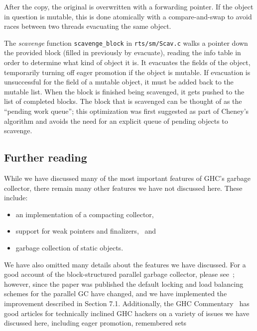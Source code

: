After the copy, the original is overwritten with a forwarding pointer.
If the object in question is mutable, this is done atomically with a
compare-and-swap to avoid races between two threads evacuating the same
object.

The \emph{scavenge} function \verb|scavenge_block| in
\verb|rts/sm/Scav.c| walks a pointer down the provided block (filled in
previously by evacuate), reading the info table in order to determine
what kind of object it is.  It evacuates the fields of the object,
temporarily turning off eager promotion if the object is mutable.  If
evacuation is unsuccessful for the field of a mutable object, it must be
added back to the mutable list.  When the block is finished being
scavenged, it gets pushed to the list of completed blocks.  The block
that is scavenged can be thought of as the ``pending work queue''; this
optimization was first suggested as part of Cheney's algorithm and
avoids the need for an explicit queue of pending objects to scavenge.

\subsection{Further reading}

While we have discussed many of the most important features of GHC's
garbage collector, there remain many other features we have not
discussed here.  These include:

\begin{itemize}
    \item an implementation of a compacting collector, 
    \item support for weak pointers and finalizers,~\cite{PeytonJones:1999:SSM:647978.743369}  and
    \item garbage collection of static objects.
\end{itemize}

We have also omitted many details about the features we have discussed.
For a good account of the block-structured parallel garbage collector,
please see~\cite{Marlow:2008:PGG:1375634.1375637}; however, since the
paper was published the default locking and load balancing schemes for
the parallel GC have changed, and we have implemented the improvement
described in Section 7.1.  Additionally, the GHC Commentary~\cite{ghc-gc-commentary} has good
articles for technically inclined GHC hackers on a variety of issues we
have discussed here, including eager promotion, remembered
sets 
